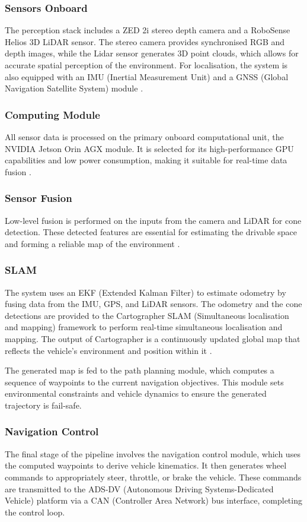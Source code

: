 \documentclass[conference]{IEEEtran}
\begin{document}
\subsubsection{Sensors Onboard}
The perception stack includes a ZED 2i stereo depth camera and a RoboSense Helios 3D LiDAR sensor. The stereo camera provides synchronised RGB and depth images, while the Lidar sensor generates 3D point clouds, which allows for accurate spatial perception of the environment. For localisation, the system is also equipped with an IMU (Inertial Measurement Unit) and a GNSS (Global Navigation Satellite System) module \cite{stereolabs_zed2i} \cite{b3}. 

\subsubsection{Computing Module}
All sensor data is processed on the primary onboard computational unit, the NVIDIA Jetson Orin AGX module. It is selected for its high-performance GPU capabilities and low power consumption, making it suitable for real-time data fusion \cite{b4}. 

\subsubsection{Sensor Fusion}
Low-level fusion is performed on the inputs from the camera and LiDAR for cone detection. These detected features are essential for estimating the drivable space and forming a reliable map of the environment \cite{b14}.  

\subsubsection{SLAM}
The system uses an EKF (Extended Kalman Filter) to estimate odometry by fusing data from the IMU, GPS, and LiDAR sensors\cite{b7}. The odometry and the cone detections are provided to the Cartographer SLAM (Simultaneous localisation and mapping) framework to perform real-time simultaneous localisation and mapping. The output of Cartographer is a continuously updated global map that reflects the vehicle’s environment and position within it \cite{b5} \cite{b6}.

The generated map is fed to the path planning module, which computes a sequence of waypoints to the current navigation objectives. This module sets environmental constraints and vehicle dynamics to ensure the generated trajectory is fail-safe. 

\subsubsection{Navigation Control}
The final stage of the pipeline involves the navigation control module, which uses the computed waypoints to derive vehicle kinematics. It then generates wheel commands to appropriately steer, throttle, or brake the vehicle. These commands are transmitted to the ADS-DV (Autonomous Driving Systems-Dedicated Vehicle) platform via a CAN (Controller Area Network) bus interface, completing the control loop.
\end{document}
